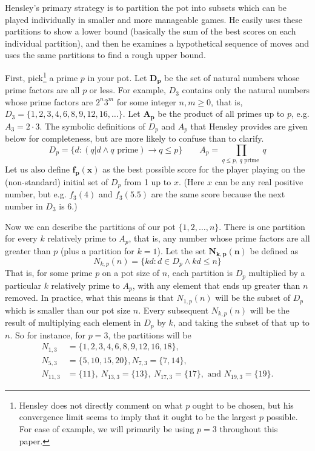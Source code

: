 \documentclass[a4paper,10pt]{amsart} %
\begin{document}
Hensley's primary strategy is to partition the pot into subsets which can be played individually in smaller and more manageable games. He easily uses these partitions to show a lower bound (basically the sum of the best scores on each individual partition), and then he examines a hypothetical sequence of moves and uses the same partitions to find a rough upper bound. 

First, pick\footnote{Hensley does not directly comment on what $p$ ought to be chosen, but his convergence limit seems to imply that it ought to be the largest $p$ possible. For ease of example, we will primarily be using $p = 3$ throughout this paper.} a prime $p$ in your pot. Let $\mathbf{D_p}$ be the set of natural numbers whose prime factors are all $p$ or less. For example, $D_3$ contains only the natural numbers whose prime factors are $2^n 3^m$ for some integer $n, m \geq 0$, that is, $D_3 = \{1, 2, 3, 4, 6, 8, 9, 12, 16, \dots \}$. Let $\mathbf{A_p}$ be the product of all primes up to $p$, e.g. $A_3 = 2 \cdot 3$. The symbolic definitions of $D_p$ and $A_p$ that Hensley provides are given below for completeness, but are more likely to confuse than to clarify.
\begin{equation*}
    D_p = \{d : (q|d \wedge q \text{ prime}) \rightarrow q \leq p \} \qquad A_p = \prod_{q \leq p,\ q \text{ prime }} q
\end{equation*}
Let us also define $\mathbf{f_p (x)}$ as the best possible score for the player playing on the (non-standard) initial set of $D_p$ from 1 up to $x$. (Here $x$ can be any real positive number, but e.g. $f_3(4)$ and $f_3(5.5)$ are the same score because the next number in $D_3$ is 6.)

Now we can describe the partitions of our pot $\{1, 2, \dots, n \}$. There is one partition for every $k$ relatively prime to $A_p$, that is, any number whose prime factors are all greater than $p$ (plus a partition for $k = 1$). Let the set $\mathbf{N_{k,p}(n)}$ be defined as 
\begin{equation*}
    N_{k,p} (n) = \{kd : d \in D_p \wedge kd \leq n \}
\end{equation*}
That is, for some prime $p$ on a pot size of $n$, each partition is $D_p$ multiplied by a particular $k$ relatively prime to $A_p$, with any element that ends up greater than $n$ removed. In practice, what this means is that $N_{1, p} (n)$ will be the subset of $D_p$ which is smaller than our pot size $n$. Every subsequent $N_{k,p}(n)$ will be the result of multiplying each element in $D_p$ by $k$, and taking the subset of that up to $n$. So for instance, for $p = 3$, the partitions will be
\begin{align*}
    N_{1,3}&=\{1,2,3,4,6,8,9,12,16,18\},\\
    N_{5,3}&=\{5,10,15,20\},
    N_{7,3} =\{7,14\},\\
    N_{11,3}&=\{11\},\ N_{13,3}=\{13\},\ N_{17,3}=\{17\},\text{ and }N_{19,3}=\{19\}.
\end{align*}
\end{document}
